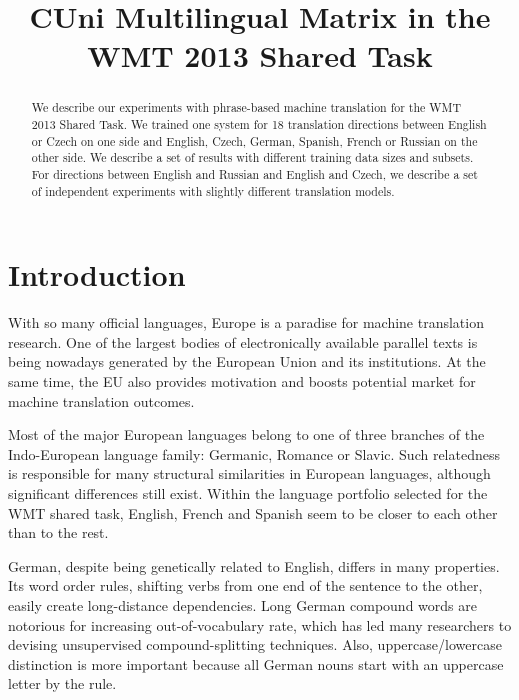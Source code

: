 \documentclass[11pt,letterpaper]{article}
\title{CUni Multilingual Matrix in the WMT 2013 Shared Task}
\date{}
\newcommand{\todo}[1]{\textcolor{red}{[TODO: {#1}]}} %
\begin{document}
	\maketitle
	\begin{abstract}
We describe our experiments with phrase-based machine translation for the WMT 2013 Shared Task.
We trained one system for 18 translation directions between English or Czech on one side
and English, Czech, German, Spanish, French or Russian on the other side.
We describe a set of results with different training data sizes and subsets. For directions between English and Russian and English and Czech, we describe a set of independent experiments with slightly different translation models.
	\end{abstract}


\begin{comment} %
\section{Osnova}
\todo{
\begin{itemize}
\item Quotation marks; our heuristics, official normalization, we do not want it primary for human evaluation
\end{itemize}
}
\end{comment}



\section{Introduction}
\label{sec:intro}

With so many official languages, Europe is a paradise for machine translation research.
One of the largest bodies of electronically available parallel texts is being nowadays generated by the European Union and its institutions.
At the same time, the EU also provides motivation and boosts potential market for machine translation outcomes.

Most of the major European languages belong to one of three branches of the Indo-European language family: Germanic, Romance or Slavic.
Such relatedness is responsible for many structural similarities in European languages, although significant differences still exist.
Within the language portfolio selected for the WMT shared task, English, French and Spanish seem to be closer to each other than to the rest.

German, despite being genetically related to English, differs in many properties.
Its word order rules, shifting verbs from one end of the sentence to the other, easily create long-distance dependencies.
Long German compound words are notorious for increasing out-of-vocabulary rate, which has led many researchers to devising unsupervised compound-splitting techniques.
Also, uppercase/lowercase distinction is more important because all German nouns start with an uppercase letter by the rule.
\end{document}
